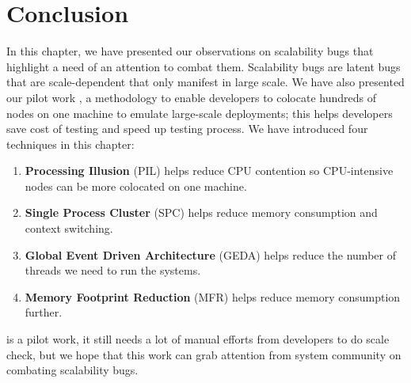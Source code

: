 \section{Conclusion}

In this chapter, we have presented our observations on scalability bugs that
highlight a need of an attention to combat them. Scalability bugs are latent
bugs that are scale-dependent that only manifest in large scale. We have also
presented our pilot work \sck, a methodology to enable developers to colocate
hundreds of nodes on one machine to emulate large-scale deployments; this helps
developers save cost of testing and speed up testing process. We have introduced
four techniques in this chapter:

\begin{enumerate}

\item {\bf Processing Illusion} (PIL) helps reduce CPU contention so
CPU-intensive nodes can be more colocated on one machine.

\item {\bf Single Process Cluster} (SPC) helps reduce memory consumption and
context switching.

\item {\bf Global Event Driven Architecture} (GEDA) helps reduce the number of
threads we need to run the systems.

\item {\bf Memory Footprint Reduction} (MFR) helps reduce memory consumption
further.

\end{enumerate}

\sck is a pilot work, it still needs a lot of manual efforts from developers to
do scale check, but we hope that this work can grab attention from system
community on combating scalability bugs.
